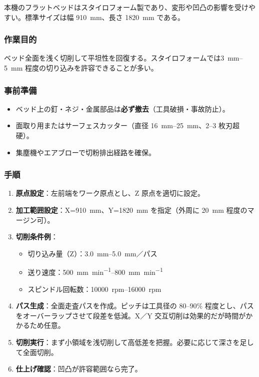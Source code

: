 \documentclass[uplatex,dvipdfmx]{ujarticle}
\begin{document}
本機のフラットベッドはスタイロフォーム製であり、変形や凹凸の影響を受けやすい。標準サイズは幅 \SI{910}{\milli\meter}、長さ \SI{1820}{\milli\meter} である。

\subsubsection*{作業目的}
ベッド全面を浅く切削して平坦性を回復する。スタイロフォームでは\SIrange{3}{5}{\milli\meter} 程度の切り込みを許容できることが多い。

\subsubsection*{事前準備}
\begin{itemize}
  \item ベッド上の釘・ネジ・金属部品は\textbf{必ず撤去}（工具破損・事故防止）。
  \item 面取り用またはサーフェスカッター（直径 \SIrange{16}{25}{\milli\meter}、2--3 枚刃超硬）。
  \item 集塵機やエアブローで切粉排出経路を確保。
\end{itemize}

\subsubsection*{手順}
\begin{enumerate}
  \item \textbf{原点設定}：左前端をワーク原点とし、Z 原点を適切に設定。
  \item \textbf{加工範囲設定}：X=\SI{910}{\milli\meter}、Y=\SI{1820}{\milli\meter} を指定（外周に \SI{20}{\milli\meter} 程度のマージン可）。
  \item \textbf{切削条件例}：
  \begin{itemize}
    \item 切り込み量（Z）：\SIrange{3.0}{5.0}{\milli\meter}／パス
    \item 送り速度：\SIrange{500}{800}{\milli\meter\per\minute}
    \item スピンドル回転数：\SIrange{10000}{16000}{rpm}
  \end{itemize}
  \item \textbf{パス生成}：全面走査パスを作成。ピッチは工具径の 80--90\% 程度とし、パスをオーバーラップさせて段差を低減。X／Y 交互切削は効果的だが時間がかかるため任意。
  \item \textbf{切削実行}：まず小領域を浅切削して高低差を把握。必要に応じて深さを足して全面切削。
  \item \textbf{仕上げ確認}：凹凸が許容範囲なら完了。
\end{enumerate}
\end{document}
